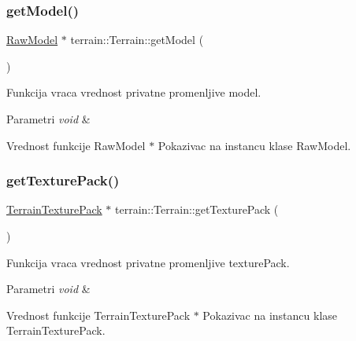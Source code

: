 \subsubsection{\texorpdfstring{get\+Model()}{getModel()}}
{\footnotesize\ttfamily \hyperlink{classmodel_1_1RawModel}{Raw\+Model} $\ast$ terrain\+::\+Terrain\+::get\+Model (\begin{DoxyParamCaption}{ }\end{DoxyParamCaption})}



Funkcija vraca vrednost privatne promenljive model. 


\begin{DoxyParams}{Parametri}
{\em void} & \\
\hline
\end{DoxyParams}
\begin{DoxyReturn}{Vrednost funkcije}
Raw\+Model $\ast$ Pokazivac na instancu klase Raw\+Model. 
\end{DoxyReturn}
\mbox{\label{classterrain_1_1Terrain_a6b6100654d9bb6f5f5ea004cc5bf95f4}} 
\subsubsection{\texorpdfstring{get\+Texture\+Pack()}{getTexturePack()}}
{\footnotesize\ttfamily \hyperlink{classtexture_1_1TerrainTexturePack}{Terrain\+Texture\+Pack} $\ast$ terrain\+::\+Terrain\+::get\+Texture\+Pack (\begin{DoxyParamCaption}{ }\end{DoxyParamCaption})}



Funkcija vraca vrednost privatne promenljive texture\+Pack. 


\begin{DoxyParams}{Parametri}
{\em void} & \\
\hline
\end{DoxyParams}
\begin{DoxyReturn}{Vrednost funkcije}
Terrain\+Texture\+Pack $\ast$ Pokazivac na instancu klase Terrain\+Texture\+Pack. 
\end{DoxyReturn}
\mbox{\label{classterrain_1_1Terrain_a7498906e811d059461be143d7323a6f9}} 
